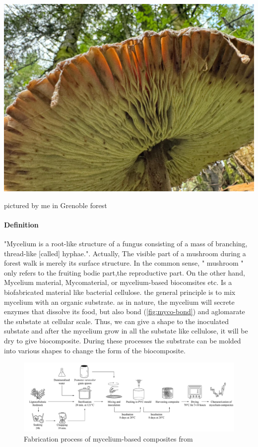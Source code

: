 \begin{marginfigure}
    \centering
    \includegraphics{images/champi.png}    
    \caption{pictured by me in Grenoble forest}
    \label{fig:champi}
\end{marginfigure}


\paragraph[short]{Definition}
"Mycelium is a root-like structure of a fungus consisting of a mass of branching, thread-like [called] hyphae."\cite{wikipediaMycelium}. Actually, The visible part of a mushroom during a forest walk is merely its surface structure. In the common sense, " mushroom " only refers to the fruiting bodie part,the reproductive part. 
On the other hand, Mycelium material, Mycomaterial, or mycelium-based biocomsites etc. Is a biofabricated material like bacterial cellulose. the general principle is to mix mycelium with an organic substrate. as in nature, the mycelium will secrete enzymes that dissolve its food, but also bond\cite{MonikaBrandićLipińskaHBBE} (\ref{fig:myco-bond}) and aglomarate the substate at cellular scale. 
Thus, we can give a shape to the inoculated substate and after the mycelium grow in all the substate like cellulose, it will be dry to give biocomposite. During these processes the substrate can be molded into various shapes to change the form of the biocomposite. 

\begin{figure}[h]
    \centering
    \includegraphics[width=1.4\textwidth]{images/Fabrication_process.png}
    \caption{Fabrication process of mycelium-based composites from  \cite{elsacker2019mechanical}}
    \label{fig:Fab_process}
\end{figure} 

